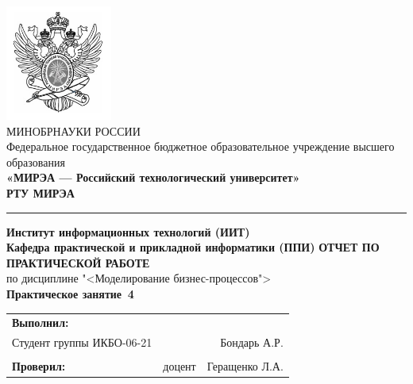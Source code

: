 \begin{titlepage}
	
	\thispagestyle{fancy}
	\renewcommand{\headrulewidth}{0pt}
	\setlength{\headheight}{17.0pt}

	\begin{center}
		\includegraphics[scale=0.5]{./res/logo}\\ %
		МИНОБРНАУКИ РОССИИ\\
		Федеральное государственное бюджетное образовательное
		учреждение высшего образования\\
		\textbf{«МИРЭА --- Российский технологический университет»}\\
		\textbf{\large РТУ МИРЭА}\\
		\bigskip \hrule \smallskip
		\textbf{
			Институт информационных технологий (ИИТ)\\
			Кафедра практической и прикладной информатики (ППИ)
		}
		\vfill
		\textbf{\large ОТЧЕТ ПО ПРАКТИЧЕСКОЙ РАБОТЕ}\\
		по дисциплине "<Моделирование бизнес-процессов">\\
		\vfill
		\textbf{
			Практическое занятие \No\,4\\
		}
		\vfill
		\vfill
		\begin{tabular}{lrr}
			\textbf{Выполнил:} & &\\
			Студент группы ИКБО-06-21 & & Бондарь А.Р. \\\\
			\textbf{Проверил:} &  доцент & Геращенко Л.А. \\
		\end{tabular}
		\vfill
	\end{center}
\end{titlepage}
\setcounter{page}{2}
\clearpage

